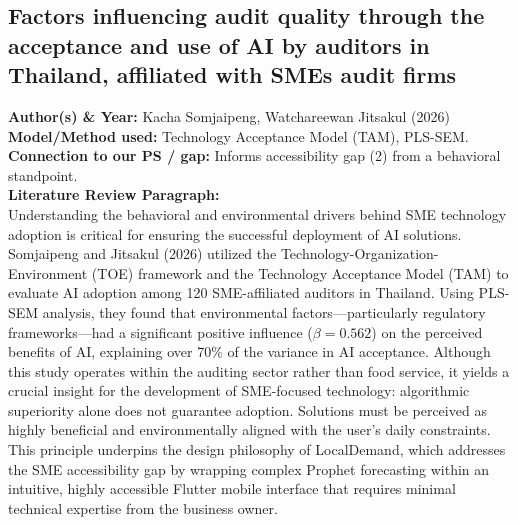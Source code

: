 \documentclass[conference]{IEEEtran}
\begin{document}
\subsection{Factors influencing audit quality through the acceptance and use of AI by auditors in Thailand, affiliated with SMEs audit firms}
\textbf{Author(s) \& Year:} Kacha Somjaipeng, Watchareewan Jitsakul (2026)\\
\textbf{Model/Method used:} Technology Acceptance Model (TAM), PLS-SEM.\\
\textbf{Connection to our PS / gap:} Informs accessibility gap (2) from a behavioral standpoint.\\
\textbf{Literature Review Paragraph:}\\
Understanding the behavioral and environmental drivers behind SME technology adoption is critical for ensuring the successful deployment of AI solutions. Somjaipeng and Jitsakul (2026) utilized the Technology-Organization-Environment (TOE) framework and the Technology Acceptance Model (TAM) to evaluate AI adoption among 120 SME-affiliated auditors in Thailand. Using PLS-SEM analysis, they found that environmental factors---particularly regulatory frameworks---had a significant positive influence ($\beta = 0.562$) on the perceived benefits of AI, explaining over 70\% of the variance in AI acceptance. Although this study operates within the auditing sector rather than food service, it yields a crucial insight for the development of SME-focused technology: algorithmic superiority alone does not guarantee adoption. Solutions must be perceived as highly beneficial and environmentally aligned with the user's daily constraints. This principle underpins the design philosophy of LocalDemand, which addresses the SME accessibility gap by wrapping complex Prophet forecasting within an intuitive, highly accessible Flutter mobile interface that requires minimal technical expertise from the business owner.
\end{document}
